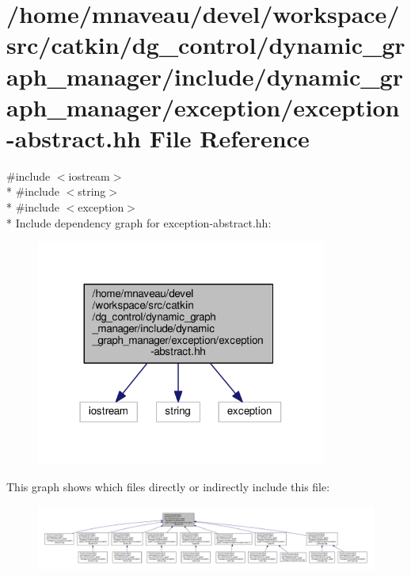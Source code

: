 \hypertarget{exception-abstract_8hh}{}\section{/home/mnaveau/devel/workspace/src/catkin/dg\+\_\+control/dynamic\+\_\+graph\+\_\+manager/include/dynamic\+\_\+graph\+\_\+manager/exception/exception-\/abstract.hh File Reference}
\label{exception-abstract_8hh}
{\ttfamily \#include $<$iostream$>$}\\*
{\ttfamily \#include $<$string$>$}\\*
{\ttfamily \#include $<$exception$>$}\\*
Include dependency graph for exception-\/abstract.hh\+:\nopagebreak
\begin{figure}[H]
\begin{center}
\leavevmode
\includegraphics[width=271pt]{exception-abstract_8hh__incl}
\end{center}
\end{figure}
This graph shows which files directly or indirectly include this file\+:\nopagebreak
\begin{figure}[H]
\begin{center}
\leavevmode
\includegraphics[width=350pt]{exception-abstract_8hh__dep__incl}
\end{center}
\end{figure}
